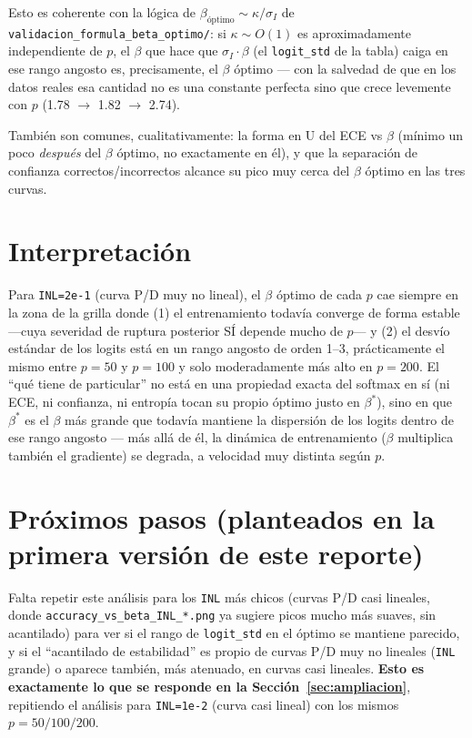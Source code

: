 \documentclass[11pt]{article}
\begin{document}
Esto es coherente con la lógica de $\beta_{\text{óptimo}}\sim\kappa/\sigma_I$
de \texttt{validacion\_formula\_beta\_optimo/}: si $\kappa\sim O(1)$ es
aproximadamente independiente de $p$, el $\beta$ que hace que
$\sigma_I\cdot\beta$ (el \texttt{logit\_std} de la tabla) caiga en ese
rango angosto es, precisamente, el $\beta$ óptimo — con la salvedad de que
en los datos reales esa cantidad no es una constante perfecta sino que
crece levemente con $p$ (1.78 $\to$ 1.82 $\to$ 2.74).

También son comunes, cualitativamente: la forma en U del ECE vs $\beta$
(mínimo un poco \emph{después} del $\beta$ óptimo, no exactamente en él), y
que la separación de confianza correctos/incorrectos alcance su pico muy
cerca del $\beta$ óptimo en las tres curvas.

\section{Interpretación}

Para \texttt{INL=2e-1} (curva P/D muy no lineal), el $\beta$ óptimo de cada
$p$ cae siempre en la zona de la grilla donde (1) el entrenamiento todavía
converge de forma estable —cuya severidad de ruptura posterior SÍ depende
mucho de $p$— y (2) el desvío estándar de los logits está en un rango
angosto de orden 1--3, prácticamente el mismo entre $p{=}50$ y $p{=}100$ y
solo moderadamente más alto en $p{=}200$. El ``qué tiene de particular''
no está en una propiedad exacta del softmax en sí (ni ECE, ni confianza,
ni entropía tocan su propio óptimo justo en $\beta^*$), sino en que
$\beta^*$ es el $\beta$ más grande que todavía mantiene la dispersión de
los logits dentro de ese rango angosto — más allá de él, la dinámica de
entrenamiento ($\beta$ multiplica también el gradiente) se degrada, a
velocidad muy distinta según $p$.

\section{Próximos pasos (planteados en la primera versión de este reporte)}

Falta repetir este análisis para los \texttt{INL} más chicos (curvas P/D
casi lineales, donde \texttt{accuracy\_vs\_beta\_INL\_*.png} ya sugiere
picos mucho más suaves, sin acantilado) para ver si el rango de
\texttt{logit\_std} en el óptimo se mantiene parecido, y si el
``acantilado de estabilidad'' es propio de curvas P/D muy no lineales
(\texttt{INL} grande) o aparece también, más atenuado, en curvas casi
lineales. \textbf{Esto es exactamente lo que se responde en la
Sección~\ref{sec:ampliacion}}, repitiendo el análisis para
\texttt{INL=1e-2} (curva casi lineal) con los mismos $p=50/100/200$.
\end{document}
